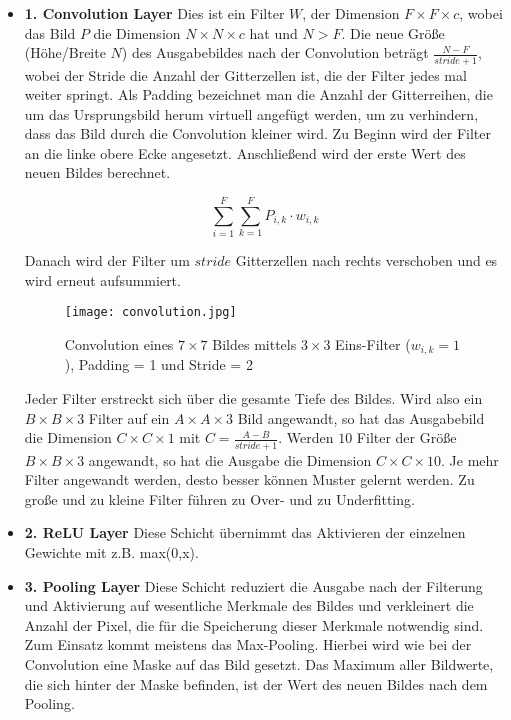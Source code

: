 \documentclass[11pt,ceqn]{book}
\begin{document}
\begin{itemize}
\item \textbf{1. Convolution Layer} Dies ist ein Filter $W$, der Dimension $F \times F\times c$, wobei das Bild $P$ die Dimension $N\times N\times c$ hat und $N>F$. Die neue Größe (Höhe/Breite $N$) des Ausgabebildes nach der Convolution beträgt $\frac{N-F}{stride+1}$, wobei der Stride die Anzahl der Gitterzellen ist, die der Filter jedes mal weiter springt. Als Padding bezeichnet man die Anzahl der Gitterreihen, die um das Ursprungsbild herum virtuell angefügt werden, um zu verhindern, dass das Bild durch die Convolution kleiner wird. Zu Beginn wird der Filter an die linke obere Ecke angesetzt. Anschließend wird der erste Wert des neuen Bildes berechnet.

\[\sum_{i=1}^F \sum_{k=1}^F{P_{i,k} \cdot w_{i,k}}\]

Danach wird der Filter um $stride$ Gitterzellen nach rechts verschoben und es wird erneut aufsummiert.

\begin{figure}[H]
\centering
\texttt{[image: convolution.jpg]}
\caption{Convolution eines $7 \times 7$ Bildes mittels $3 \times 3$ Eins-Filter ($w_{i,k} = 1$), Padding = 1 und Stride = 2}
\end{figure}

Jeder Filter erstreckt sich über die gesamte Tiefe des Bildes. Wird also ein $B\times B\times 3$ Filter auf ein $A\times A\times 3$ Bild angewandt, so hat das Ausgabebild die Dimension $C\times C\times 1$ mit $C = \frac{A-B}{stride+1}$. Werden $10$ Filter der Größe $B\times B\times 3$ angewandt, so hat die Ausgabe die Dimension $C\times C\times 10$. Je mehr Filter angewandt werden, desto besser können Muster gelernt werden. Zu große und zu kleine Filter führen zu Over- und zu Underfitting.

\item \textbf{2. ReLU Layer} Diese Schicht übernimmt das Aktivieren der einzelnen Gewichte mit z.B. max(0,x).

\item \textbf{3. Pooling Layer} Diese Schicht reduziert die Ausgabe nach der Filterung und Aktivierung auf wesentliche Merkmale des Bildes und verkleinert die Anzahl der Pixel, die für die Speicherung dieser Merkmale notwendig sind. Zum Einsatz kommt meistens das Max-Pooling. Hierbei wird wie bei der Convolution eine Maske auf das Bild gesetzt. Das Maximum aller Bildwerte, die sich hinter der Maske befinden, ist der Wert des neuen Bildes nach dem Pooling. 


\end{itemize}
\end{document}
